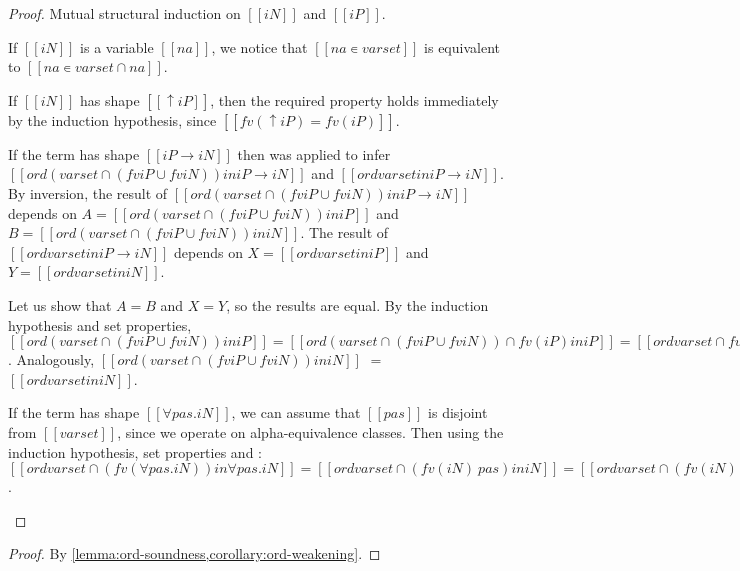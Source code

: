 \lemOrdWeakening*
\begin{proof}
  Mutual structural induction on $[[iN]]$ and $[[iP]]$.

  \begin{caseof}
    \item If $[[iN]]$ is a variable $[[na]]$,
      we notice that $[[na ∊ varset]]$ 
      is equivalent to $[[na ∊ varset ∩ {na}]]$.
    \item If $[[iN]]$ has shape $[[↑iP]]$, then
      the required property holds immediately by the 
      induction hypothesis, since 
      $[[fv(↑iP) = fv(iP)]]$.
    \item If the term has shape $[[iP → iN]]$ then
       was applied
      to infer $[[ ord (varset ∩ (fv iP ∪ fv iN)) in iP → iN ]]$
      and $[[ ord varset in iP → iN]]$. 
      By inversion, the result of 
      $[[ ord (varset ∩ (fv iP ∪ fv iN)) in iP → iN ]]$
      depends on 
      $A = [[ ord (varset ∩ (fv iP ∪ fv iN)) in iP]]$
      and 
      $B = [[ ord (varset ∩ (fv iP ∪ fv iN)) in iN]]$.
      The result of
       $[[ ord varset in iP → iN]]$ 
       depends on 
      $X = [[ord varset in iP]]$ and
      $Y = [[ord varset in iN]]$.

      Let us show that $A = B$ and $X = Y$, so the results are equal. 
      By the induction hypothesis and set properties,
      $[[ ord (varset ∩ (fv iP ∪ fv iN)) in iP ]] = 
       [[ ord (varset ∩ (fv iP ∪ fv iN)) ∩ fv(iP) in iP ]] = 
       [[ ord varset ∩ fv(iP) in iP ]] = 
       [[ ord varset in iP ]]$.
      Analogously, 
      $[[ ord (varset ∩ (fv iP ∪ fv iN)) in iN ]]$ $=$
      \\ $[[ ord varset in iN ]]$.
    \item If the term has shape $[[∀pas.iN]]$,
      we can assume that $[[pas]]$ is disjoint
      from $[[varset]]$,
      since we operate on alpha-equivalence classes.
      Then using the induction hypothesis,
      set properties and : 
      $[[ord varset ∩ (fv(∀pas.iN)) in ∀pas.iN]] =
       [[ord varset ∩ (fv(iN) \ {pas}) in iN]] =
       [[ord varset ∩ (fv(iN) \ {pas}) ∩ fv(iN) in iN]] =
       [[ord varset ∩ fv(iN) in iN]] =
       [[ord varset in iN]]$.
  \end{caseof}
\end{proof}

\corOrdIdemp*
\begin{proof}
  By \cref{lemma:ord-soundness,corollary:ord-weakening}.
\end{proof}
  

